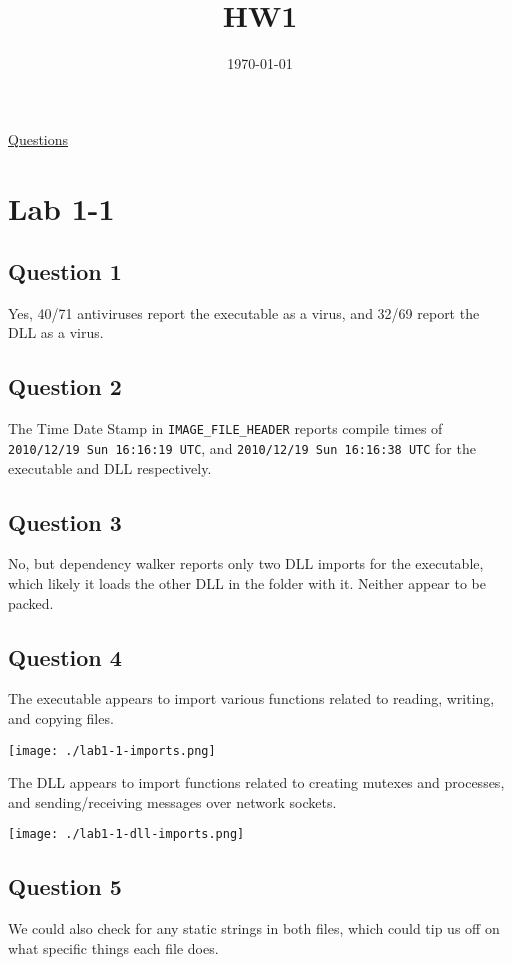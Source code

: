 \documentclass[11pt]{article}
\date{\today}
\title{HW1}
\begin{document}
\maketitle
\tableofcontents

\href{https://docs.google.com/document/d/1aNu32\_XUJ-QjYssRXdDGC0mFVrMKvvZ5pdPrUU9PejU/edit}{Questions}

\section{Lab 1-1}
\label{sec:org40add04}
\subsection{Question 1}
\label{sec:orga6e9e0e}
Yes, 40/71 antiviruses report the executable as a virus, and 32/69
report the DLL as a virus.
\subsection{Question 2}
\label{sec:org7e72cb3}
The Time Date Stamp in \texttt{IMAGE\_FILE\_HEADER} reports compile times of
\texttt{2010/12/19 Sun 16:16:19 UTC}, and \texttt{2010/12/19 Sun 16:16:38 UTC} for
the executable and DLL respectively.
\subsection{Question 3}
\label{sec:orgc90671f}
No, but dependency walker reports only two DLL imports for the
executable, which likely it loads the other DLL in the folder with it.
Neither appear to be packed.
\subsection{Question 4}
\label{sec:org30a9a4e}
The executable appears to import various functions related to reading,
writing, and copying files.

\begin{center}
\texttt{[image: ./lab1-1-imports.png]}
\end{center}

The DLL appears to import functions related to creating mutexes and
processes, and sending/receiving messages over network sockets.

\begin{center}
\texttt{[image: ./lab1-1-dll-imports.png]}
\end{center}
\subsection{Question 5}
\label{sec:orge7aa3f2}
We could also check for any static strings in both files, which could
tip us off on what specific things each file does.
\end{document}
